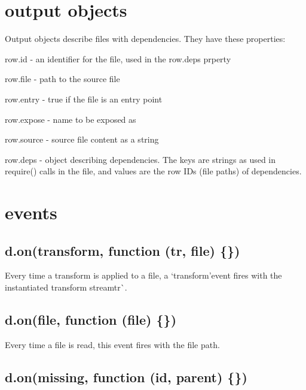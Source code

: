 \section*{output objects}

Output objects describe files with dependencies. They have these properties\+:


\begin{DoxyItemize}
\item {\ttfamily row.\+id} -\/ an identifier for the file, used in the {\ttfamily row.\+deps} prperty
\item {\ttfamily row.\+file} -\/ path to the source file
\item {\ttfamily row.\+entry} -\/ true if the file is an entry point
\item {\ttfamily row.\+expose} -\/ name to be exposed as
\item {\ttfamily row.\+source} -\/ source file content as a string
\item {\ttfamily row.\+deps} -\/ object describing dependencies. The keys are strings as used in {\ttfamily require()} calls in the file, and values are the row I\+Ds (file paths) of dependencies.
\end{DoxyItemize}

\section*{events}

\subsection*{d.\+on(\textquotesingle{}transform\textquotesingle{}, function (tr, file) \{\})}

Every time a transform is applied to a {\ttfamily file}, a `\textquotesingle{}transform'{\ttfamily event fires with the instantiated transform stream}tr\`{}.

\subsection*{d.\+on(\textquotesingle{}file\textquotesingle{}, function (file) \{\})}

Every time a file is read, this event fires with the file path.

\subsection*{d.\+on(\textquotesingle{}missing\textquotesingle{}, function (id, parent) \{\})}


